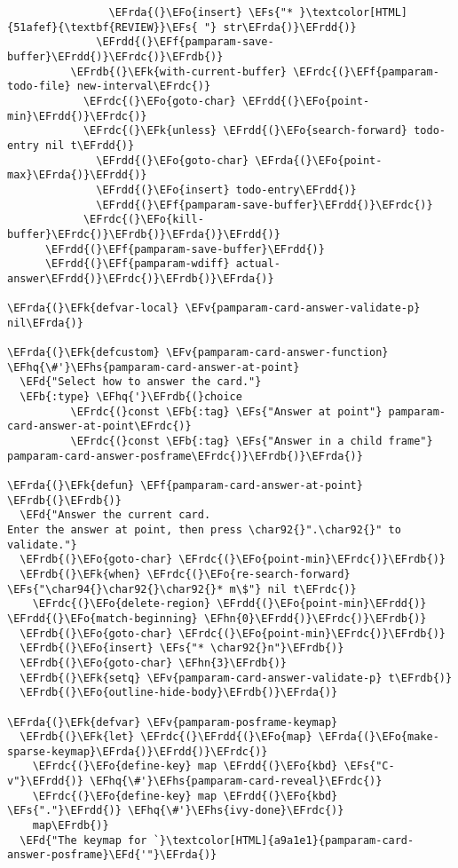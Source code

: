 \documentclass[a4wide,10pt]{article}
\newcommand{\EFs}[1]{\textcolor{EFs}{#1}} %
\newcommand{\EFd}[1]{\textcolor{EFd}{#1}} %
\newcommand{\EFk}[1]{\textcolor{EFk}{#1}} %
\newcommand{\EFb}[1]{\textcolor{EFb}{#1}} %
\newcommand{\EFf}[1]{\textcolor{EFf}{#1}} %
\newcommand{\EFv}[1]{\textcolor{EFv}{#1}} %
\newcommand{\EFo}[1]{\textcolor{EFo}{#1}} %
\newcommand{\EFhn}[1]{\textcolor{EFhn}{\textbf{#1}}} %
\newcommand{\EFhq}[1]{\textcolor{EFhq}{#1}} %
\newcommand{\EFhs}[1]{\textcolor{EFhs}{#1}} %
\newcommand{\EFrda}[1]{\textcolor{EFrda}{#1}} %
\newcommand{\EFrdb}[1]{\textcolor{EFrdb}{#1}} %
\newcommand{\EFrdc}[1]{\textcolor{EFrdc}{#1}} %
\newcommand{\EFrdd}[1]{\textcolor{EFrdd}{#1}} %
\begin{document}
\begin{Code}
\begin{Verbatim}
                \EFrda{(}\EFo{insert} \EFs{"* }\textcolor[HTML]{51afef}{\textbf{REVIEW}}\EFs{ "} str\EFrda{)}\EFrdd{)}
              \EFrdd{(}\EFf{pamparam-save-buffer}\EFrdd{)}\EFrdc{)}\EFrdb{)}
          \EFrdb{(}\EFk{with-current-buffer} \EFrdc{(}\EFf{pamparam-todo-file} new-interval\EFrdc{)}
            \EFrdc{(}\EFo{goto-char} \EFrdd{(}\EFo{point-min}\EFrdd{)}\EFrdc{)}
            \EFrdc{(}\EFk{unless} \EFrdd{(}\EFo{search-forward} todo-entry nil t\EFrdd{)}
              \EFrdd{(}\EFo{goto-char} \EFrda{(}\EFo{point-max}\EFrda{)}\EFrdd{)}
              \EFrdd{(}\EFo{insert} todo-entry\EFrdd{)}
              \EFrdd{(}\EFf{pamparam-save-buffer}\EFrdd{)}\EFrdc{)}
            \EFrdc{(}\EFo{kill-buffer}\EFrdc{)}\EFrdb{)}\EFrda{)}\EFrdd{)}
      \EFrdd{(}\EFf{pamparam-save-buffer}\EFrdd{)}
      \EFrdd{(}\EFf{pamparam-wdiff} actual-answer\EFrdd{)}\EFrdc{)}\EFrdb{)}\EFrda{)}

\EFrda{(}\EFk{defvar-local} \EFv{pamparam-card-answer-validate-p} nil\EFrda{)}

\EFrda{(}\EFk{defcustom} \EFv{pamparam-card-answer-function} \EFhq{\#'}\EFhs{pamparam-card-answer-at-point}
  \EFd{"Select how to answer the card."}
  \EFb{:type} \EFhq{'}\EFrdb{(}choice
          \EFrdc{(}const \EFb{:tag} \EFs{"Answer at point"} pamparam-card-answer-at-point\EFrdc{)}
          \EFrdc{(}const \EFb{:tag} \EFs{"Answer in a child frame"} pamparam-card-answer-posframe\EFrdc{)}\EFrdb{)}\EFrda{)}

\EFrda{(}\EFk{defun} \EFf{pamparam-card-answer-at-point} \EFrdb{(}\EFrdb{)}
  \EFd{"Answer the current card.
Enter the answer at point, then press \char92{}".\char92{}" to validate."}
  \EFrdb{(}\EFo{goto-char} \EFrdc{(}\EFo{point-min}\EFrdc{)}\EFrdb{)}
  \EFrdb{(}\EFk{when} \EFrdc{(}\EFo{re-search-forward} \EFs{"\char94{}\char92{}\char92{}* m\$"} nil t\EFrdc{)}
    \EFrdc{(}\EFo{delete-region} \EFrdd{(}\EFo{point-min}\EFrdd{)} \EFrdd{(}\EFo{match-beginning} \EFhn{0}\EFrdd{)}\EFrdc{)}\EFrdb{)}
  \EFrdb{(}\EFo{goto-char} \EFrdc{(}\EFo{point-min}\EFrdc{)}\EFrdb{)}
  \EFrdb{(}\EFo{insert} \EFs{"* \char92{}n"}\EFrdb{)}
  \EFrdb{(}\EFo{goto-char} \EFhn{3}\EFrdb{)}
  \EFrdb{(}\EFk{setq} \EFv{pamparam-card-answer-validate-p} t\EFrdb{)}
  \EFrdb{(}\EFo{outline-hide-body}\EFrdb{)}\EFrda{)}

\EFrda{(}\EFk{defvar} \EFv{pamparam-posframe-keymap}
  \EFrdb{(}\EFk{let} \EFrdc{(}\EFrdd{(}\EFo{map} \EFrda{(}\EFo{make-sparse-keymap}\EFrda{)}\EFrdd{)}\EFrdc{)}
    \EFrdc{(}\EFo{define-key} map \EFrdd{(}\EFo{kbd} \EFs{"C-v"}\EFrdd{)} \EFhq{\#'}\EFhs{pamparam-card-reveal}\EFrdc{)}
    \EFrdc{(}\EFo{define-key} map \EFrdd{(}\EFo{kbd} \EFs{"."}\EFrdd{)} \EFhq{\#'}\EFhs{ivy-done}\EFrdc{)}
    map\EFrdb{)}
  \EFd{"The keymap for `}\textcolor[HTML]{a9a1e1}{pamparam-card-answer-posframe}\EFd{'"}\EFrda{)}


\end{Verbatim}
\end{Code}
\end{document}
